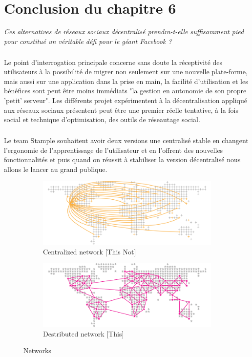 \section{Conclusion du chapitre 6}
\textit{Ces alternatives de réseaux sociaux décentralisé prendra-t-elle suffisamment pied pour constitué un véritable défi pour le géant Facebook ?}
\subparagraph{}
Le point d'interrogation principale concerne sans doute la réceptivité des utilisateurs à la possibilité de migrer non seulement sur une nouvelle plate-forme, mais aussi sur une application dans la prise en main, la facilité d'utilisation et les bénéfices sont peut être moins immédiats "la gestion en autonomie de son propre 'petit' serveur".
Les différents projet expérimentent à la décentralisation appliqué aux réseaux sociaux présentent peut être une premier réelle tentative, à la fois social et technique d'optimisation, des outils de réseautage social.
\subparagraph{}
Le team Stample souhaitent avoir deux versions une centralisé stable en changent l'ergonomie de l'apprentissage de l'utilisateur et en l'offrent des nouvelles fonctionnalités et puis quand on réussit à stabiliser la version décentralisé nous allons le lancer au grand publique.  

\begin{figure}[H]
        \centering
        \begin{subfigure}[b]{0.7\textwidth}
                \centering
                \includegraphics[width=\textwidth]{network-centralized.png}
                \caption{Centralized network [This Not]}
                \label{fig:Centralized network}
        \end{subfigure}
      
         \begin{subfigure}[b]{0.7\textwidth}
                \centering
                \includegraphics[width=\textwidth]{network-distributed.png}
                \caption{Destributed network [This]}
                \label{fig:Destributed network}
        \end{subfigure}
        \caption{Networks}\label{fig:Networks}
\end{figure}

